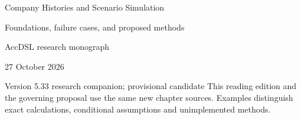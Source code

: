 \documentclass[11pt,a4paper]{report}
\begin{document}
\hypersetup{pageanchor=false}
\begin{titlepage}
{\Huge Company Histories and Scenario Simulation\par}
\vspace{12mm}
{\Large Foundations, failure cases, and proposed methods\par}
\vspace{8mm}
AccDSL research monograph\par 27 October 2026\par Version 5.33 research companion; provisional candidate
\vfill
This reading edition and the governing proposal use the same new chapter sources. Examples distinguish exact calculations, conditional assumptions and unimplemented methods.
\end{titlepage}
\hypersetup{pageanchor=true}
\tableofcontents
\clearpage{}


























\clearpage\label{sim:body-end}

\begingroup\raggedright
\endgroup
\end{document}
